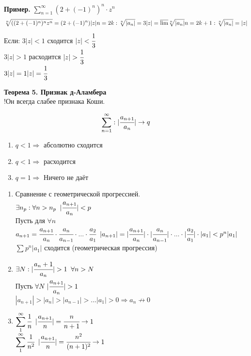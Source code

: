 \documentclass[12pt, a4paper]{article}
\begin{document}
\begin{centering}
\textbf{Пример.} $ \sum^\infty_{n=1} (2+(-1)^n)^n \cdot z^n$\\
\[
	\sqrt[n]{((2+(-1)^n)^n z^n} = (2+(-1)^n)|z|\\
	n = 2k: \sqrt[n]{|a_n|} = 3|z| = \overline{\lim} \sqrt[n]{|a_n|} \\
	n = 2k+1: \sqrt[n]{|a_n|} = |z|\\ 
\]
Если: 
	$3|z| < 1$ сходится $|z| < \cfrac{1}{3}$\\
	$3|z| > 1$ расходится $|z| > \cfrac{1}{3}$\\
	$3|z| = 1 |z| = \cfrac{1}{3} $

\textbf{Теорема 5. Признак д-Аламбера}\\
!Он всегда слабее признака Коши.
\begin{tcolorbox}
	\[
		\sum_{n=1}^{\infty}: |\cfrac{a_{n+1}}{a_{n}}| \to q
	\]
\begin{enumerate}
	\item $q < 1 \Rightarrow$ абсолютно сходится
	\item $q < 1 \Rightarrow$ расходится
	\item $q = 1 \Rightarrow$ Ничего не даёт
\end{enumerate}
\end{tcolorbox}

\begin{tcolorbox}[title=Доказательство.]
	\begin{enumerate}
		\item  Сравнение с геометрической прогрессией.\\
		$\exists n_p: \forall n > n_p \;\; |\cfrac{a_{n + 1}}{a_n}| < p$\\
		Пусть для $\forall n$\\
		$ a_{n+1} = \cfrac{a_{n+1}}{a_n} \cdot  \cfrac{a_{n}}{a_{n-1}} \cdot ... \cdot \cfrac{a_{2}}{a_1} $
		$ |a_{n+1}| = |\cfrac{a_{n+1}}{a_n}| \cdot  |\cfrac{a_{n}}{a_{n-1}}| \cdot ... \cdot |\cfrac{a_{2}}{a_1}| \cdot |a_1| < p^n |a_1| $\\
		$ \displaystyle\sum_{}^{} p^n |a_1|$ сходится (геометрическая прогрессия)
	\item $\exists N: |\cfrac{a{_n+1}}{a_n}| > 1\;\; \forall n > N$\\
		Пусть $ \forall N\; |\cfrac{a_{n+1}}{a_n}| > 1 $\\
		$ |a_{n+1}| > |a_{n}| > |a_{n-1}| > ... |a_{1}| > 0 \Rightarrow a_n \not\to 0$
	\item $ \displaystyle\sum_{1}^{\infty} \cfrac{1}{n}\;\; |\cfrac{a_{n+1}}{n}| = \cfrac{n}{n+1} \to 1$\\
		$ \displaystyle\sum_{1}^{\infty} \cfrac{1}{n^2}\;\; |\cfrac{a_{n+1}}{n}| = \cfrac{n^2}{(n+1)^2} \to 1$\\
 	\end{enumerate}
\end{tcolorbox}


\end{centering}
\end{document}
